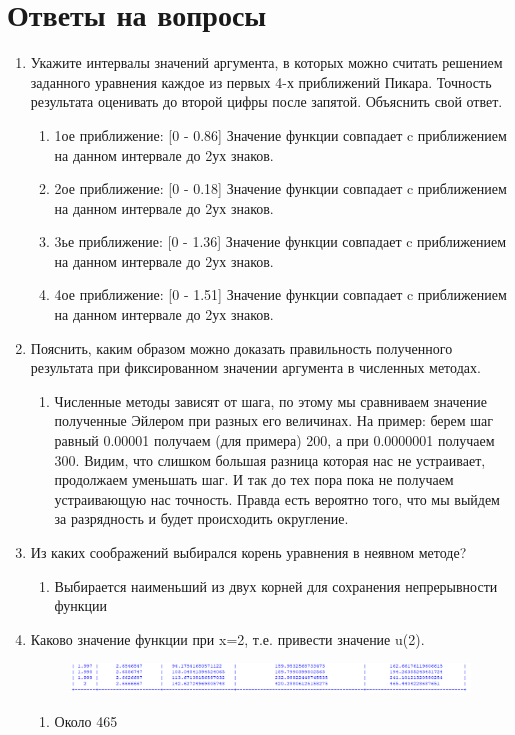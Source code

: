 \documentclass[12pt,a4paper]{scrartcl}
\begin{document}
	\section{Ответы на вопросы}
	\begin{enumerate}
		\item Укажите интервалы значений аргумента, в которых можно считать решением заданного уравнения каждое из первых 4-х  приближений Пикара. Точность результата оценивать до второй цифры после запятой. Объяснить свой ответ.
		\begin{enumerate}
			\item 1ое приближение: [0 - 0.86] Значение функции совпадает c приближением на данном интервале до 2ух знаков. 
			\item 2ое приближение: [0 - 0.18] Значение функции совпадает c приближением на данном интервале до 2ух знаков. 
			\item 3ье приближение: [0 - 1.36] Значение функции совпадает c приближением на данном интервале до 2ух знаков.
			\item 4ое приближение: [0 - 1.51] Значение функции совпадает c приближением на данном интервале до 2ух знаков.
		\end{enumerate}
		\item Пояснить, каким образом можно доказать правильность полученного результата при фиксированном значении аргумента  в численных методах. 
		\begin{enumerate}
			\item Численные методы зависят от шага, по этому мы сравниваем значение полученные Эйлером при разных его величинах. На пример: берем шаг равный 0.00001 получаем (для примера) 200, а при 0.0000001 получаем 300. Видим, что слишком большая разница которая нас не устраивает, продолжаем уменьшать шаг. И так до тех пора пока не получаем устраивающую нас точность. Правда есть вероятно того, что мы выйдем за разрядность и будет происходить округление.
		\end{enumerate}
		\item Из каких соображений выбирался корень уравнения в неявном методе?
		\begin{enumerate}
			\item Выбирается наименьший из двух корней для сохранения непрерывности функции
		\end{enumerate}
		\item Каково значение функции при x=2, т.е. привести значение u(2).
		\begin{figure}
			\centering
			\includegraphics[width=\linewidth]{4}
			\caption{}
			\label{fig:4}
		\end{figure}
		
		\begin{enumerate}
			\item Около 465
		\end{enumerate}
	\end{enumerate}
\end{document}
